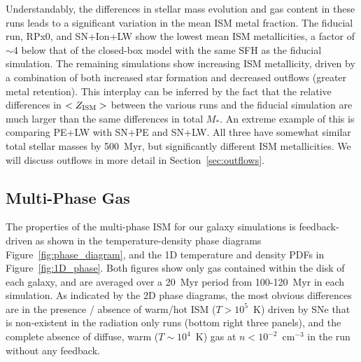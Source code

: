 \documentclass[twocolumn]{aastex62}
\newcommand{\aje}[1]{\textcolor{blue}{\textbf{(AJE: #1)}}}
\begin{document}
Understandably, the differences in stellar mass evolution and gas content in these runs leads to a significant variation in the mean ISM metal fraction. The fiducial run, RPx0, and SN+Ion+LW show the lowest mean ISM metallicities, a factor of $\sim$4 below that of the closed-box model with the same SFH as the fiducial simulation. The remaining simulations show increasing ISM metallicity, driven by a combination of both increased star formation and decreased outflows (greater metal retention). This interplay can be inferred by the fact that the relative differences in $<Z_{\rm ISM}>$ between the various runs and the fiducial simulation are much larger than the same differences in total $M_{*}$. An extreme example of this is comparing PE+LW with SN+PE and SN+LW. All three have somewhat similar total stellar masses by 500~Myr, but significantly different ISM metallicities. We will discuss outflows in more detail in Section~\ref{sec:outflows}.

\subsection{Multi-Phase Gas}
\label{sec:phase diagrams}

The properties of the multi-phase ISM for our galaxy simulations is feedback-driven as shown in the temperature-density phase diagrams Figure~\ref{fig:phase_diagram}, and the 1D temperature and density PDFs in Figure~\ref{fig:1D_phase}. Both figures show only gas contained within the disk of each galaxy, and are averaged over a 20~Myr period from 100-120~Myr in each simulation. As indicated by the 2D phase diagrams, the most obvious differences are in the presence / absence of warm/hot ISM ($T > 10^5$~K) driven by SNe that is non-existent in the radiation only runs (bottom right three panels), and the complete absence of diffuse, warm ($T \sim 10^4$~K) gas at $n < 10^{-2}$~cm$^{-3}$ in the run without any feedback. 
\end{document}

